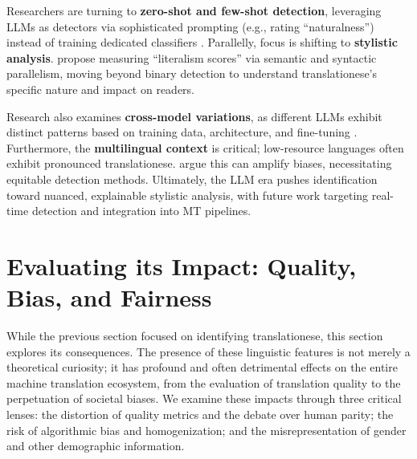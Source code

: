 \documentclass[11pt,a4paper]{article}
\begin{document}
Researchers are turning to \textbf{zero-shot and few-shot detection}, leveraging LLMs as detectors via sophisticated prompting (e.g., rating ``naturalness'') instead of training dedicated classifiers \cite{dabre2024pretraining}. Parallelly, focus is shifting to \textbf{stylistic analysis}. \citet{li2025lost} propose measuring ``literalism scores'' via semantic and syntactic parallelism, moving beyond binary detection to understand translationese's specific nature and impact on readers.

Research also examines \textbf{cross-model variations}, as different LLMs exhibit distinct patterns based on training data, architecture, and fine-tuning \cite{wang2024benchmarking}. Furthermore, the \textbf{multilingual context} is critical; low-resource languages often exhibit pronounced translationese. \citet{jourdan2025translationese} argue this can amplify biases, necessitating equitable detection methods. Ultimately, the LLM era pushes identification toward nuanced, explainable stylistic analysis, with future work targeting real-time detection and integration into MT pipelines.

\section{Evaluating its Impact: Quality, Bias, and Fairness}

While the previous section focused on identifying translationese, this section explores its consequences. The presence of these linguistic features is not merely a theoretical curiosity; it has profound and often detrimental effects on the entire machine translation ecosystem, from the evaluation of translation quality to the perpetuation of societal biases. We examine these impacts through three critical lenses: the distortion of quality metrics and the debate over human parity; the risk of algorithmic bias and homogenization; and the misrepresentation of gender and other demographic information.
\end{document}
